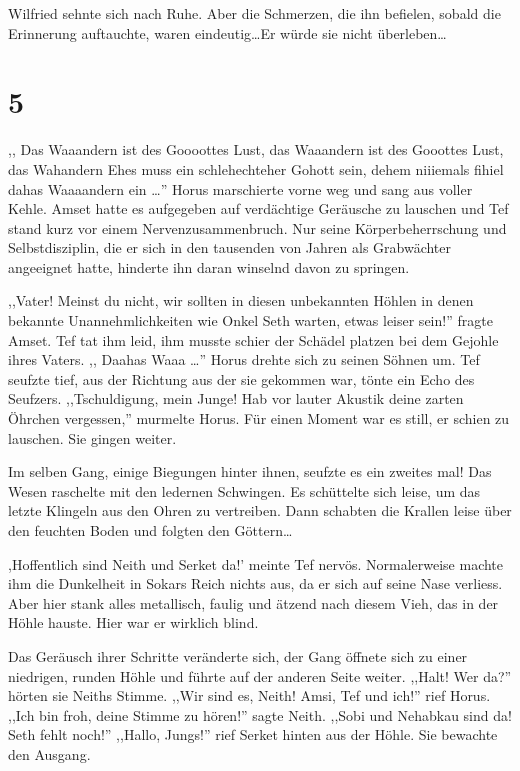 \documentclass[11pt,titlepage,a5paper]{book}
\begin{document}
Wilfried sehnte sich nach Ruhe. Aber die Schmerzen, die ihn befielen, sobald die Erinnerung auftauchte, waren eindeutig\dots Er würde sie nicht überleben\dots

\section*{5}

,, \eighthnote \twonotes{} Das Waaandern ist des Goooottes  Lust,  \eighthnote \twonotes{} das Waaandern ist des Gooottes Lust, das Wahandern \eighthnote \twonotes{} Ehes muss ein schlehechteher Gohott sein, \eighthnote \twonotes{} dehem niiiemals fihiel dahas Waaaandern ein\eighthnote \twonotes{} \dots '' Horus marschierte vorne weg und sang aus voller Kehle. Amset hatte es aufgegeben auf verdächtige Geräusche zu lauschen und Tef stand kurz vor einem Nervenzusammenbruch. Nur seine Körperbeherrschung und Selbstdisziplin, die er sich in den tausenden von Jahren als Grabwächter angeeignet hatte, hinderte ihn daran winselnd davon zu springen.

,,Vater! Meinst du nicht, wir sollten in diesen unbekannten Höhlen in denen bekannte Unannehmlichkeiten wie Onkel Seth warten, etwas leiser sein!'' fragte Amset. Tef tat ihm leid, ihm musste schier der Schädel platzen bei dem Gejohle ihres Vaters. ,, \eighthnote \twonotes{} Daahas Waaa\eighthnote \twonotes{} \dots '' Horus drehte sich zu seinen Söhnen um. Tef seufzte tief, aus der Richtung aus der sie gekommen war, tönte ein Echo des Seufzers. ,,Tschuldigung, mein Junge! Hab vor lauter Akustik deine zarten Öhrchen vergessen,'' murmelte Horus. Für einen Moment war es still, er schien zu lauschen. Sie gingen weiter.

Im selben Gang, einige Biegungen hinter ihnen, seufzte es ein zweites mal! Das Wesen raschelte mit den ledernen Schwingen. Es schüttelte sich leise, um das letzte Klingeln aus den Ohren zu vertreiben. Dann schabten die Krallen leise über den feuchten Boden und folgten den Göttern\dots 

,Hoffentlich sind Neith und Serket da!' meinte Tef nervös. Normalerweise machte ihm die Dunkelheit in Sokars Reich nichts aus, da er sich auf seine Nase verliess. Aber hier stank alles metallisch, faulig und ätzend nach diesem Vieh, das in der Höhle hauste. Hier war er wirklich blind.

Das Geräusch ihrer Schritte veränderte sich, der Gang öffnete sich zu einer niedrigen, runden Höhle und führte auf der anderen Seite weiter. ,,Halt! Wer da?'' hörten sie Neiths Stimme. ,,Wir sind es, Neith! Amsi, Tef und ich!'' rief Horus. ,,Ich bin froh, deine Stimme zu hören!'' sagte Neith. ,,Sobi und Nehabkau sind da! Seth fehlt noch!'' ,,Hallo, Jungs!'' rief Serket hinten aus der Höhle. Sie bewachte den Ausgang.
\end{document}
